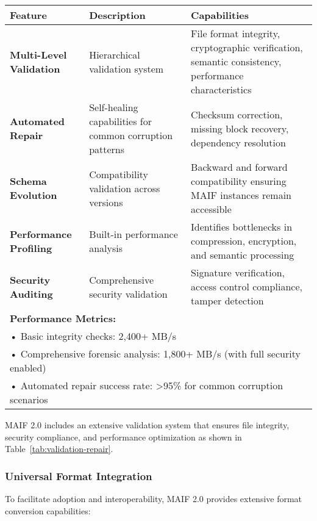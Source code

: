 \documentclass[conference]{IEEEtran}
\begin{document}
\begin{table*}[!t]
\renewcommand{\arraystretch}{1.3}
\caption{MAIF Validation and Repair Framework Features}
\label{tab:validation-repair}
\centering
\footnotesize
\begin{tabular}{p{3cm}p{6cm}p{5cm}}
\toprule
\textbf{Feature} & \textbf{Description} & \textbf{Capabilities} \\
\midrule
\textbf{Multi-Level Validation} & Hierarchical validation system & File format integrity, cryptographic verification, semantic consistency, performance characteristics \\
\textbf{Automated Repair} & Self-healing capabilities for common corruption patterns & Checksum correction, missing block recovery, dependency resolution \\
\textbf{Schema Evolution} & Compatibility validation across versions & Backward and forward compatibility ensuring MAIF instances remain accessible \\
\textbf{Performance Profiling} & Built-in performance analysis & Identifies bottlenecks in compression, encryption, and semantic processing \\
\textbf{Security Auditing} & Comprehensive security validation & Signature verification, access control compliance, tamper detection \\
\midrule
\multicolumn{3}{l}{\textbf{Performance Metrics:}} \\
\multicolumn{3}{l}{• Basic integrity checks: 2,400+ MB/s} \\
\multicolumn{3}{l}{• Comprehensive forensic analysis: 1,800+ MB/s (with full security enabled)} \\
\multicolumn{3}{l}{• Automated repair success rate: >95\% for common corruption scenarios} \\
\bottomrule
\end{tabular}
\end{table*}

MAIF 2.0 includes an extensive validation system that ensures file integrity, security compliance, and performance optimization as shown in Table~\ref{tab:validation-repair}.

\subsubsection{Universal Format Integration}

To facilitate adoption and interoperability, MAIF 2.0 provides extensive format conversion capabilities:
\end{document}
